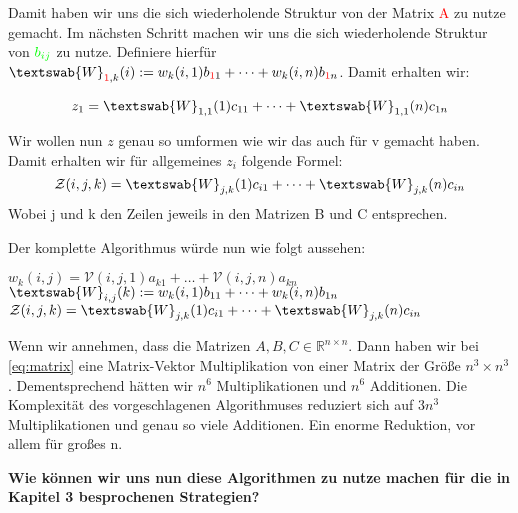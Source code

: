 Damit haben wir uns die sich wiederholende Struktur von der Matrix \textcolor{red}{A} zu nutze gemacht. Im nächsten Schritt machen wir uns die sich wiederholende Struktur von $\textcolor{green}{b_{ij}}$ zu nutze.
Definiere hierfür $\textswab{W}_{\textcolor{red}{1},k} (i):= w_k(i,1) b_{\textcolor{red}{1}1} + \dots + w_k(i,n) b_{\textcolor{red}{1}n}$. Damit erhalten wir:

\begin{equation} \label{eq:znew}
\begin{aligned}
z_{1}= \textswab{W}_{1,1}(1) c_{11}  + \dots +  \textswab{W}_{1,1}(n) c_{1n} 
\end{aligned}
\end{equation}

Wir wollen nun $z$ genau so umformen wie wir das auch für v gemacht haben. Damit erhalten wir für allgemeines $z_{i}$ folgende Formel:
\begin{equation}
\mathcal{Z}(i,j,k) = \textswab{W}_{j,k}(1) c_{i1}  + \dots +  \textswab{W}_{j,k}(n) c_{in} 
\end{equation}
Wobei j und k den Zeilen jeweils in den Matrizen B und C entsprechen. 

Der komplette Algorithmus würde nun wie folgt aussehen:
\begin{framed}
\begin{algorithmic}
			\State $w_{k}(i,j) = \mathcal{V}(i,j,1)a_{k1} + \dots + \mathcal{V}(i,j,n)a_{kn}$
		\EndFor
	\EndFor
\EndFor
{}
			\State $\textswab{W}_{i,j} (k):= w_k(i,1) b_{11} + \dots + w_k(i,n) b_{1n}$
		\EndFor
	\EndFor
\EndFor
{}
			\State $\mathcal{Z}(i,j,k) = \textswab{W}_{j,k}(1) c_{i1}  + \dots +  \textswab{W}_{j,k}(n) c_{in}$ 
		\EndFor
	\EndFor
\EndFor
\end{algorithmic}
\end{framed}

 
Wenn wir annehmen, dass die Matrizen $A,B,C \in \mathbb{R}^{n \times n}$. Dann haben wir bei \ref{eq:matrix} eine Matrix-Vektor Multiplikation von einer Matrix der Größe $n^{3} \times n^{3}$. Dementsprechend hätten wir $n^{6}$ Multiplikationen und $n^{6}$ Additionen. Die Komplexität des vorgeschlagenen Algorithmuses reduziert sich auf $3n^{3}$ Multiplikationen und genau so viele Additionen.
Ein enorme Reduktion, vor allem für großes n.

\textbf{Wie können wir uns nun diese Algorithmen zu nutze machen für die in Kapitel 3 besprochenen Strategien?} \\

